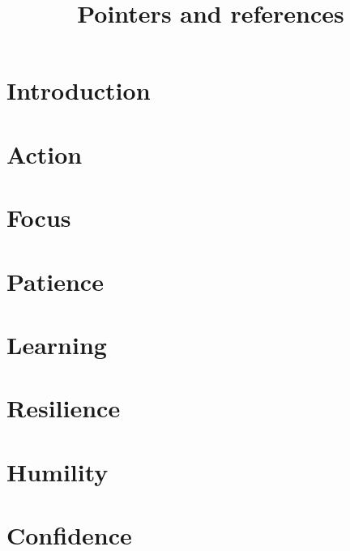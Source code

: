 \documentclass{book}
\title{Pointers and references}
\author{}
\begin{document}
\maketitle{}
\tableofcontents

\chapter{Introduction}


\chapter{Action}


\chapter{Focus}


\chapter{Patience}


\chapter{Learning}


\chapter{Resilience}


\chapter{Humility}


\chapter{Confidence}


\end{document}
